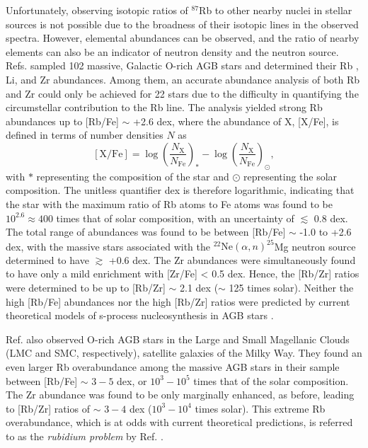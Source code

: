 Unfortunately, observing isotopic ratios of $^{87}$Rb to other nearby nuclei in stellar sources is not possible due to the broadness of their isotopic lines in the observed spectra. However, elemental abundances can be observed, and the ratio of nearby elements can also be an indicator of neutron density and the neutron source. Refs. \cite{Garcia2006,Garcia2007} sampled 102 massive, Galactic O-rich AGB stars and determined their Rb \cite{Garcia2006}, Li, and Zr \cite{Garcia2007} abundances. Among them, an accurate abundance analysis of both Rb and Zr could only be achieved for 22 stars due to the difficulty in quantifying the circumstellar contribution to the Rb line. The analysis yielded strong Rb abundances up to [Rb/Fe] $\sim$ +2.6 dex, where the abundance of X, [X/Fe], is defined in terms of number densities $N$ as
\begin{equation} \label{eqn:abundance}
[\mathrm{X}/\mathrm{Fe}] = \log\left( \frac{N_{\mathrm{X}}}{N_{\mathrm{Fe}}} \right)_{\ast} - \log\left( \frac{N_{\mathrm{X}}}{N_{\mathrm{Fe}}} \right)_{\odot},
\end{equation}
with $\ast$ representing the composition of the star and $\odot$ representing the solar composition. The unitless quantifier dex is therefore logarithmic, indicating that the star with the maximum ratio of  Rb atoms to Fe atoms was found to be $10^{2.6} \approx 400$ times that of solar composition, with an uncertainty of $\lesssim$ 0.8 dex. The total range of abundances was found to be between [Rb/Fe] $\sim$ -1.0 to +2.6 dex, with the massive stars associated with the $^{22}\mathrm{Ne}(\alpha,n)^{25}$Mg neutron source determined to have $\gtrsim$ +0.6 dex. The Zr abundances were simultaneously found to have only a mild enrichment with [Zr/Fe] < 0.5 dex. Hence, the [Rb/Zr] ratios were determined to be up to [Rb/Zr] $\sim$ 2.1 dex ($\sim$ 125 times solar). Neither the high [Rb/Fe] abundances nor the high [Rb/Zr] ratios were predicted by current theoretical models of s-process nucleosynthesis in AGB stars \cite{Raai2012,Karakas2012}. 

Ref. \cite{Garcia2009} also observed O-rich AGB stars in the Large and Small Magellanic Clouds (LMC and SMC, respectively), satellite galaxies of the Milky Way. They found an even larger Rb overabundance among the massive AGB stars in their sample between [Rb/Fe] $\sim$ $3-5$ dex, or $10^{3}-10^{5}$ times that of the solar composition. The Zr abundance was found to be only marginally enhanced, as before, leading to [Rb/Zr] ratios of $\sim$ $3-4$ dex ($10^{3}-10^{4}$ times solar). This extreme Rb overabundance, which is at odds with current theoretical predictions, is referred to as the \emph{rubidium problem} by Ref. \cite{Garcia2009}.

